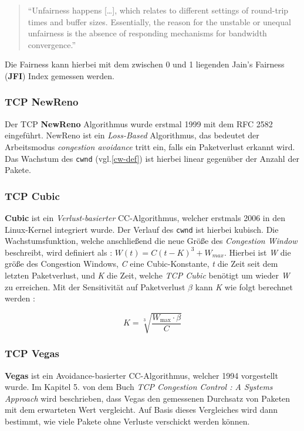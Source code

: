 \documentclass[paper=a4,fontsize=12pt,ngerman]{scrartcl}
\begin{document}

\begin{quote}
``Unfairness happens [\dots], which relates to different settings of round-trip times and buffer sizes.
Essentially, the reason for the unstable or unequal unfairness is the absence of responding mechanisms for bandwidth convergence.''\cite{tang24BBRns3}
\end{quote}
 

Die Fairness kann hierbei mit dem zwischen 0 und 1 liegenden Jain's Fairness (\textbf{JFI}) Index gemessen werden.\cite{DBLP:journals/corr/cs-NI-9809099}

\subsubsection{TCP NewReno}
Der TCP \textbf{NewReno} Algorithmus wurde erstmal 1999 mit dem RFC 2582 eingeführt.\cite{rfc2582}
NewReno ist ein \textit{Loss-Based} Algorithmus, das bedeutet der
Arbeitsmodus \textit{congestion avoidance} tritt ein, falls ein Paketverlust erkannt wird.
Das Wachstum des \texttt{cwnd} (vgl.\ref{cw-def})  ist hierbei linear gegenüber der Anzahl der Pakete.


\subsubsection{TCP Cubic}
\textbf{Cubic} ist ein \textit{Verlust-basierter} CC-Algorithmus, welcher erstmals 2006 in den Linux-Kernel integriert wurde.
Der Verlauf des \texttt{cwnd} ist hierbei kubisch.
Die Wachstumsfunktion, welche anschließend die neue Größe des \textit{Congestion Window}
beschreibt, wird definiert als : $ W(t) = C(t-K)^3 + W_{max}$.  
Hierbei ist \textit{W} die größe des Congestion Windows, \textit{C} eine Cubic-Konstante, 
\textit{t} die Zeit seit dem letzten Paketverlust, und \textit{K} die Zeit, welche \textit{TCP Cubic} benötigt 
um wieder \textit{W} zu erreichen.
Mit der Sensitivität auf Paketverlust $\beta$ kann \textit{K} wie folgt berechnet werden \cite{HArheeInjXuCUBIC} :

\[
K = \sqrt[3]{\frac{W_{\text{max}} \cdot \beta}{C}}     
\]


\subsubsection{TCP Vegas}
\textbf{Vegas} ist ein Avoidance-basierter CC-Algorithmus, welcher 1994 vorgestellt wurde.
Im Kapitel 5. von dem Buch \textit{TCP Congestion Control : A Systems Approach} wird beschrieben, dass Vegas den gemessenen Durchsatz 
von Paketen mit dem erwarteten Wert vergleicht. \cite{tcpccCh5}
Auf Basis dieses Vergleiches wird dann bestimmt, wie viele Pakete ohne Verluste verschickt werden können.
\end{document}
